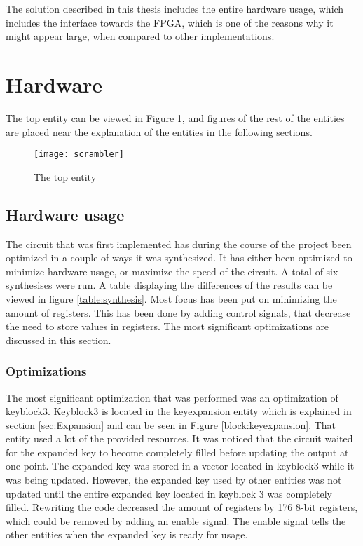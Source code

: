 The solution described in this thesis includes the entire hardware 
usage, which includes the interface towards the FPGA, which is one of 
the reasons why it might appear large, when compared to other 
implementations.

\section{Hardware}
The top entity can be viewed in Figure \ref{b:scr}, and figures of the 
rest of the entities are placed near the explanation of the entities 
in the following sections.

\begin{figure}
  \texttt{[image: scrambler]}
  \caption{The top entity}
  \label{b:scr}
\end{figure}

\subsection{Hardware usage} \label{ssec:hu}
The circuit that was first implemented has during the course of the 
project been optimized in a couple of ways it was synthesized. 
It has either been optimized to minimize hardware usage, or maximize 
the speed of the circuit. A total of six synthesises were run. A 
table displaying the differences of the results can be viewed in 
figure \ref{table:synthesis}. Most focus has been put on minimizing the 
amount of registers. This has been done by adding control signals, that 
decrease the need to store values in registers. The most significant 
optimizations are discussed in this section. 

\subsubsection{Optimizations}
The most significant optimization that was performed was an 
optimization of keyblock3. Keyblock3 is located in the keyexpansion 
entity which is explained in section \ref{sec:Expansion} and can be 
seen in Figure \ref{block:keyexpansion}. That entity used a lot of 
the provided resources. It was noticed that the circuit waited for 
the expanded key to become completely filled before updating the 
output at one point. The expanded key was stored in a vector located 
in keyblock3 while it was being updated. However, the expanded key 
used by other entities was not updated until the entire expanded key 
located in keyblock 3 was completely filled. Rewriting the code 
decreased the amount of registers by 176 8-bit registers, which could 
be removed by adding an enable signal. The enable signal tells the 
other entities when the expanded key is ready for usage.

